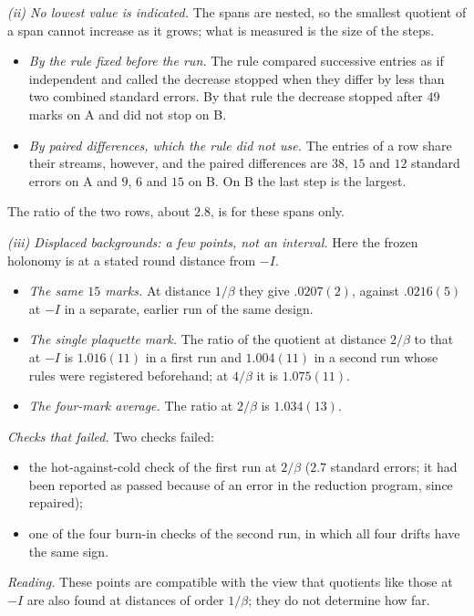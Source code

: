\emph{{\upshape(ii)} No lowest value is indicated.} The spans are nested, so the smallest quotient of a span
cannot increase as it grows; what is measured is the size of the steps.
\begin{itemize}
\item \emph{By the rule fixed before the run.} The rule compared successive entries as if independent and
called the decrease stopped when they differ by less than two combined standard errors. By that rule the
decrease stopped after $49$ marks on \textsf{A} and did not stop on \textsf{B}.
\item \emph{By paired differences, which the rule did not use.} The entries of a row share their streams,
however, and the paired differences are $38$, $15$ and $12$ standard errors on \textsf{A} and $9$, $6$ and $15$ on \textsf{B}.
On \textsf{B} the last step is the largest.
\end{itemize}
The ratio of the two rows, about $2.8$, is for these spans only.

\emph{{\upshape(iii)} Displaced backgrounds: a few points, not an interval.} Here the frozen holonomy is at a
stated round distance from $-I$.
\begin{itemize}
\item \emph{The same $15$ marks.} At distance $1/\beta$ they give $.0207(2)$, against $.0216(5)$ at $-I$ in a
separate, earlier run of the same design.
\item \emph{The single plaquette mark.} The ratio of the quotient at distance $2/\beta$ to that at $-I$ is
$1.016(11)$ in a first run and $1.004(11)$ in a second run whose rules were registered beforehand; at
$4/\beta$ it is $1.075(11)$.
\item \emph{The four-mark average.} The ratio at $2/\beta$ is $1.034(13)$.
\end{itemize}

\emph{Checks that failed.} Two checks failed:
\begin{itemize}
\item the hot-against-cold check of the first run at $2/\beta$ ($2.7$ standard errors; it had been reported
as passed because of an error in the reduction program, since repaired);
\item one of the four burn-in checks of the second run, in which all four drifts have the same sign.
\end{itemize}

\emph{Reading.} These points are compatible with the view that quotients like those at $-I$ are also found at distances of order
$1/\beta$; they do not determine how far.

